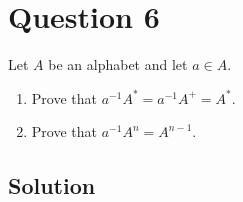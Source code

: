 
\section*{Question 6}

Let $A$ be an alphabet and let $a \in A$.

\begin{enumerate}[label=(\alph*)]

	\item
	Prove that $a^{-1}A^* = a^{-1}A^+ = A^*$.

	\item
	Prove that $a^{-1}A^n = A^{n-1}$.

\end{enumerate}

\subsection*{Solution}

